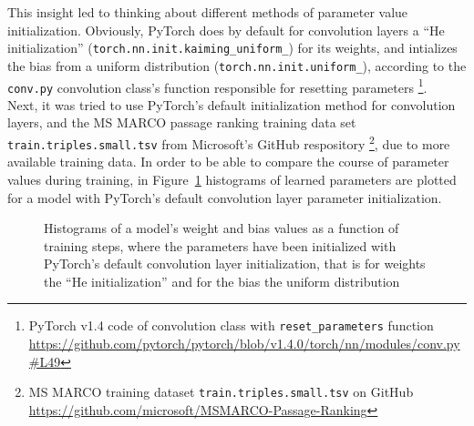 This insight led to thinking about different methods of parameter value initialization.
Obviously, PyTorch does by default for convolution layers a 
    “He initialization” (\texttt{torch.nn.init.kaiming\_uniform\_}) for its weights,
    and intializes the bias from a uniform distribution (\texttt{torch.nn.init.uniform\_}),
    according to the \texttt{conv.py} convolution class's function
    responsible for resetting parameters
    \footnote{PyTorch v1.4 code of convolution class with \texttt{reset\_parameters} function \url{https://github.com/pytorch/pytorch/blob/v1.4.0/torch/nn/modules/conv.py\#L49}}.\\
Next, it was tried to use PyTorch's default initialization method for convolution layers,
    and the MS MARCO passage ranking training data set \texttt{train.triples.small.tsv} from Microsoft's 
    GitHub respository
    \footnote{MS MARCO training dataset \texttt{train.triples.small.tsv} on GitHub \url{https://github.com/microsoft/MSMARCO-Passage-Ranking}},
    due to more available training data.
In order to be able to compare the course of parameter values during training,
    in Figure~\ref{fig:2020-09-29:histogram-parameter-default-init} histograms
    of learned parameters are plotted for a model with PyTorch's default convolution
    layer parameter initialization.

\begin{figure}[htbp]
\centering
\caption[Histogram of model parameter values as a function of training steps and initialization using PyTorch's default for convultion layers]{Histograms of a model's weight and bias values as a function of training steps, where the parameters have been initialized with PyTorch's default convolution layer initialization, that is for weights the “He initialization” and for the bias the uniform distribution}
\label{fig:2020-09-29:histogram-parameter-default-init}
\end{figure}

